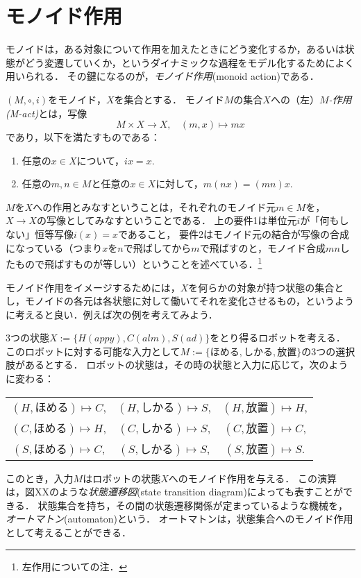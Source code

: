 \documentclass[11pt,a4paper]{jsarticle}
\begin{document}
\section{モノイド作用}
モノイドは，ある対象について作用を加えたときにどう変化するか，あるいは状態がどう変遷していくか，というダイナミックな過程をモデル化するためによく用いられる．
その鍵になるのが，\emph{モノイド作用}(monoid action)である．

\begin{dfn}
 $(M, \circ, i)$をモノイド，$X$を集合とする．
 モノイド$M$の集合$X$への（左）\emph{$M$-作用(M-act)}とは，写像
 \[
  M \times X \to X, \ \ \ \ (m, x) \mapsto mx
 \]
 であり，以下を満たすものである：
 \begin{enumerate}
  \item 任意の$x \in X$について，$ix = x$.
  \item 任意の$m, n \in M$と任意の$x \in X$に対して，$m(nx) = (mn)x$.
 \end{enumerate}
\end{dfn}
$M$を$X$への作用とみなすということは，それぞれのモノイド元$m \in M$を，$X \to X$の写像としてみなすということである．
上の要件1は単位元$i$が「何もしない」恒等写像$i(x)=x$であること，
要件2はモノイド元の結合が写像の合成になっている（つまり$x$を$n$で飛ばしてから$m$で飛ばすのと，モノイド合成$mn$したもので飛ばすものが等しい）ということを述べている．\footnote{左作用についての注．}

モノイド作用をイメージするためには，$X$を何らかの対象が持つ状態の集合とし，モノイドの各元は各状態に対して働いてそれを変化させるもの，というように考えると良い．例えば次の例を考えてみよう．
\begin{example}
 3つの状態$X := \{H(appy), C(alm), S(ad)\}$をとり得るロボットを考える．
 このロボットに対する可能な入力として$M := \{\text{ほめる}, \text{しかる}, \text{放置}\}$の3つの選択肢があるとする．
 ロボットの状態は，その時の状態と入力に応じて，次のように変わる：
\begin{center}
\begin{tabular}{ccc}
$(H, \text{ほめる}) \mapsto C$, & $(H, \text{しかる}) \mapsto S$, & $(H, \text{放置}) \mapsto H$,\\
$(C, \text{ほめる}) \mapsto H$, & $(C, \text{しかる}) \mapsto S$, & $(C, \text{放置}) \mapsto C$,\\
$(S, \text{ほめる}) \mapsto C$, & $(S, \text{しかる}) \mapsto S$, & $(S, \text{放置}) \mapsto S$.\\
\end{tabular} 
\end{center}
このとき，入力$M$はロボットの状態$X$へのモノイド作用を与える．
この演算は，図XXのような\emph{状態遷移図}(state transition diagram)によっても表すことができる．
状態集合を持ち，その間の状態遷移関係が定まっているような機械を，\emph{オートマトン}(automaton)という．
オートマトンは，状態集合へのモノイド作用として考えることができる．
\end{example}
\end{document}
